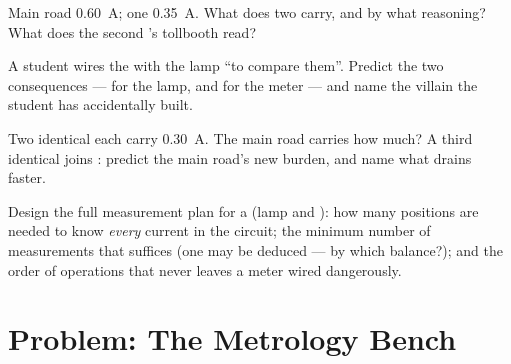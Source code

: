 \begin{exercise}[$\star\star$]\label{exo:g8:intensity-ammeter:9}
Main road \qty{0.60}{A};  one \qty{0.35}{A}. What does
 two carry, and by what reasoning? What does the second
's tollbooth read?
\end{exercise}

\begin{exercise}[$\star\star$]\label{exo:g8:intensity-ammeter:10}
A student wires the  \emph{} with the lamp
``to compare them''. Predict the two consequences --- for the
lamp, and for the meter --- and name the villain the student
has accidentally built.
\end{exercise}

\begin{exercise}[$\star\star$]\label{exo:g8:intensity-ammeter:11}
Two identical   each carry \qty{0.30}{A}. The
 main road carries how much? A third identical 
joins : predict the main road's new burden, and
name what drains faster.
\end{exercise}

\begin{exercise}[$\star\star\star$]\label{exo:g8:intensity-ammeter:12}
Design the full measurement plan for a   (lamp and ): how many  positions are
needed to know \emph{every} current in the circuit; the
minimum number of measurements that suffices (one may be
deduced --- by which balance?); and the order of operations
that never leaves a meter wired dangerously.
\end{exercise}

\section{Problem: The Metrology Bench}

